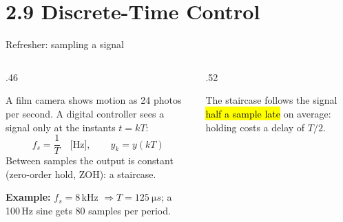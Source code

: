 \documentclass[aspectratio=169,10pt]{beamer}
\begin{document}
\section{2.9 Discrete-Time Control}

\begin{frame}{Refresher: sampling a signal}
\begin{columns}[T]
\begin{column}{.46\textwidth}
\begin{defbox}[Refresher: sampling = taking snapshots]
A film camera shows motion as 24 photos per second. A digital controller sees a signal only at the instants $t=kT$:
\[ f_s=\frac1T\quad\text{[Hz]},\qquad y_k=y(kT) \]
Between samples the output is  constant (zero-order hold, ZOH): a staircase.
\end{defbox}
\small
\textbf{Example:} $f_s=8$\,kHz $\Rightarrow T=\SI{125}{\micro s}$; a 100\,Hz sine gets 80 samples per period.
\end{column}
\begin{column}{.52\textwidth}
\centering
{}
\begin{keybox}
The staircase follows the signal \hl{half a sample late} on average: holding costs a delay of $T/2$.
\end{keybox}
\end{column}
\end{columns}
\end{frame}
\end{document}
